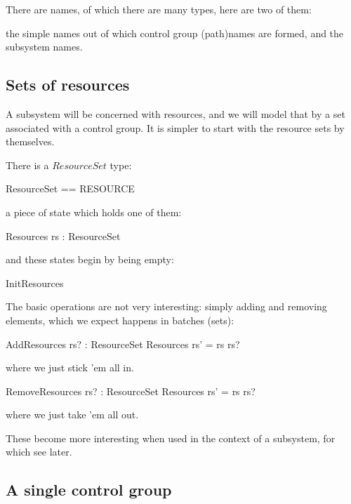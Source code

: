 \documentclass[a4paper,twoside,12pt]{article}
\begin{document}
There are names, of which there are many types, here are two of them:
\begin{zed}
\end{zed}
the simple names out of which control group (path)names are formed, and the subsystem names.

\subsection{Sets of resources}

A subsystem will be concerned with resources, and we will model that by a set associated
with a control group. It is simpler to start with the resource sets by themselves.

There is a $ResourceSet$ type:
\begin{zed}
ResourceSet == \finset RESOURCE
\end{zed}
a piece of state which holds one of them:
\begin{schema}{Resources}
rs : ResourceSet
\end{schema}
and these states begin by being empty:
\begin{zed}
InitResources 
\end{zed}

The basic operations are not very interesting: simply adding and removing elements, which we expect happens
in batches (sets):

\begin{schema}{AddResources}
rs? : ResourceSet
\also
\Delta Resources
\where
rs' = rs \cup rs?
\end{schema}
where we just stick 'em all in.

\begin{schema}{RemoveResources}
rs? : ResourceSet
\also
\Delta Resources
\where
rs' = rs \setminus rs?
\end{schema}
where we just take 'em all out.

These become more interesting when used in the context of a subsystem, for which see later.

\subsection{A single control group}
\end{document}
